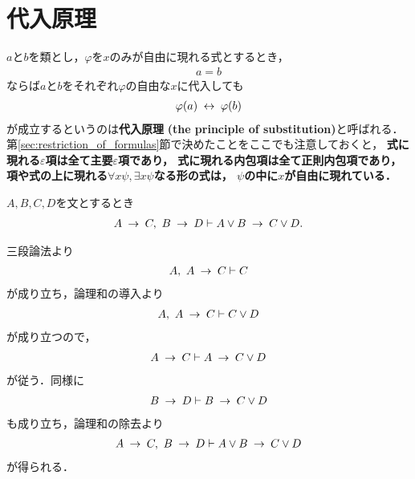 \section{代入原理}
	$a$と$b$を類とし，$\varphi$を$x$のみが自由に現れる式とするとき，
	\begin{align}
		a = b
	\end{align}
	ならば$a$と$b$をそれぞれ$\varphi$の自由な$x$に代入しても
	\begin{align}
		\varphi(a) \hspace{0.25em}\leftrightarrow\hspace{0.25em} \varphi(b)
	\end{align}
	が成立するというのは{\bf 代入原理}
	{\bf (the principle of substitution)}と呼ばれる．
	第\ref{sec:restriction_of_formulas}節で決めたことをここでも注意しておくと，
	{\bf 式に現れる$\varepsilon$項は全て主要$\varepsilon$項であり，
	式に現れる内包項は全て正則内包項であり，
	項や式の上に現れる$\forall x \psi,\exists x \psi$なる形の式は，
	$\psi$の中に$x$が自由に現れている．}
	
	\begin{screen}
		\begin{logicalthm}[含意の論理和への遺伝性2]
		\label{logicalthm:heredity_of_implication_to_disjunction_2}
			$A,B,C,D$を文とするとき
			\begin{align}
				A \hspace{0.25em}\rightarrow\hspace{0.25em} C,\ B \hspace{0.25em}\rightarrow\hspace{0.25em} D \vdash A \vee B \hspace{0.25em}\rightarrow\hspace{0.25em} C \vee D.
			\end{align}
		\end{logicalthm}
	\end{screen}
	
	\begin{sketch}
		三段論法より
		\begin{align}
			A,\ A \hspace{0.25em}\rightarrow\hspace{0.25em} C \vdash C
		\end{align}
		が成り立ち，論理和の導入より
		\begin{align}
			A,\ A \hspace{0.25em}\rightarrow\hspace{0.25em} C \vdash C \vee D
		\end{align}
		が成り立つので，
		\begin{align}
			A \hspace{0.25em}\rightarrow\hspace{0.25em} C \vdash A \hspace{0.25em}\rightarrow\hspace{0.25em} C \vee D
		\end{align}
		が従う．同様に
		\begin{align}
			B \hspace{0.25em}\rightarrow\hspace{0.25em} D \vdash B \hspace{0.25em}\rightarrow\hspace{0.25em} C \vee D
		\end{align}
		も成り立ち，論理和の除去より
		\begin{align}
			A \hspace{0.25em}\rightarrow\hspace{0.25em} C,\ B \hspace{0.25em}\rightarrow\hspace{0.25em} D \vdash A \vee B \hspace{0.25em}\rightarrow\hspace{0.25em} C \vee D
		\end{align}
		が得られる．
		\QED
	\end{sketch}
	
